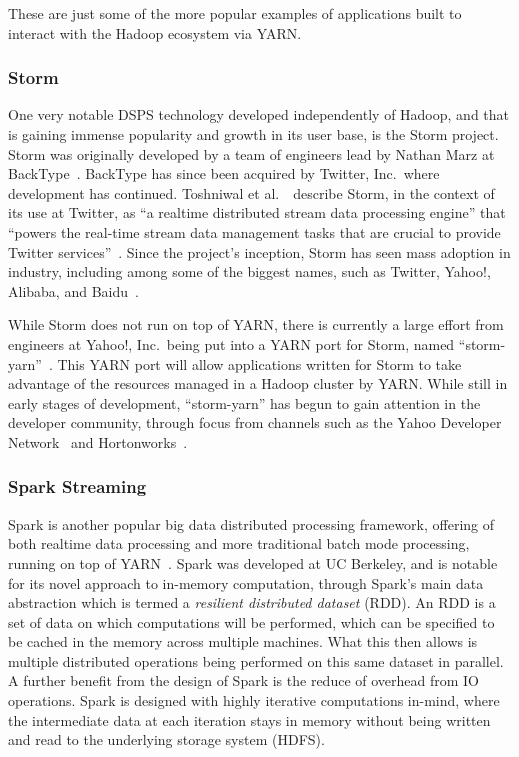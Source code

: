 These are just some of the more popular examples of applications built to interact with the Hadoop ecosystem via YARN.



\subsubsection{Storm} %
\label{ssub:storm}

One very notable DSPS technology developed independently of Hadoop, and that is gaining immense popularity and growth in its
user base, is the Storm project. Storm was originally developed by a team of engineers lead by Nathan Marz at
BackType~\cite{web_storm}. BackType has since been acquired by Twitter, Inc.\ where development has
continued. Toshniwal et al.~\cite{toshniwal2014storm}\ describe Storm, in the context of its use at Twitter, as ``a
realtime distributed stream data processing engine'' that ``powers the real-time stream data management tasks that are
crucial to provide Twitter services''~\cite[p.\ 147]{toshniwal2014storm}. Since the project's inception, Storm has seen mass
adoption in industry, including among some of the biggest names, such as Twitter, Yahoo!, Alibaba, and
Baidu~\cite{storm_users}.

While Storm does not run on top of YARN, there is currently a large effort from engineers at Yahoo!, Inc.\ being put
into a YARN port for Storm, named ``storm-yarn''~\cite{web_storm_yarn}. This YARN port will
allow applications written for Storm to take advantage of the resources managed in a Hadoop cluster by YARN. While still
in early stages of development, ``storm-yarn'' has begun to gain attention in the developer community, through focus from
channels such as the Yahoo Developer Network~\cite{web_yahoo_blog} and Hortonworks~\cite{web_hortonworks_blog}.



\subsubsection{Spark Streaming} %
\label{ssub:spark_streaming}

Spark is another popular big data distributed processing framework, offering of both realtime data processing
and more traditional batch mode processing, running on top of YARN~\cite{zaharia2010spark}. Spark was developed at UC
Berkeley, and is notable for its novel approach to in-memory computation, through Spark's main data abstraction which is
termed a \emph{resilient distributed dataset} (RDD). An RDD is a set of data on which computations will be performed,
which can be specified to be cached in the memory across multiple machines. What this then allows is multiple distributed
operations being performed on this same dataset in parallel. A further benefit from the design of Spark is the reduce of
overhead from IO operations. Spark is designed with highly iterative computations in-mind, where the intermediate data
at each iteration stays in memory without being written and read to the underlying storage system (\eg{}HDFS).

